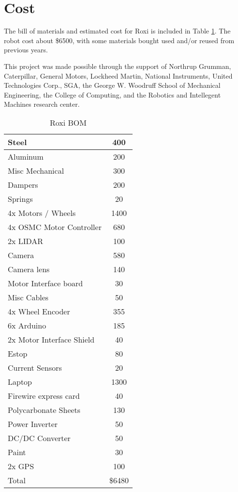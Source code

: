 \section{Cost}

The bill of materials and estimated cost for Roxi is included in Table \ref{TAB:Cost}. The robot cost about \$6500, with some materials bought used and/or reused from previous years.

This project was made possible through the support of Northrup Grumman, Caterpillar, General Motors, Lockheed Martin, National Instruments, United Technologies Corp., SGA, the George W. Woodruff School of Mechanical Engineering, the College of Computing, and the  Robotics and Intellegent Machines research center.

\begin{table}[H]
\begin{center}
\caption{Roxi BOM}
\begin{tabular}{| l | c |}
\hline

Steel	&	400\\	\hline
Aluminum	&	200\\	\hline
Misc Mechanical	&	300\\	\hline
Dampers	&	200\\	\hline
Springs	&	20\\	\hline
4x Motors / Wheels	&	1400\\	\hline
4x OSMC Motor Controller	&	680\\	\hline
2x LIDAR	&	100\\	\hline
Camera	&	580\\	\hline
Camera lens	&	140\\	\hline
Motor Interface board	&	30\\	\hline
Misc Cables	&	50\\	\hline
4x Wheel Encoder	&	355\\	\hline
6x Arduino	&	185\\	\hline
2x Motor Interface Shield	&	40\\	\hline
Estop	&	80\\	\hline
Current Sensors	&	20\\	\hline
Laptop	&	1300\\	\hline
Firewire express card	&	40\\	\hline
Polycarbonate Sheets	&	130\\	\hline
Power Inverter	&	50\\	\hline
DC/DC Converter	&	50\\	\hline
Paint	&	30\\	\hline
2x GPS	&	100\\	\hline
Total	&	\$6480\\	
\hline


\end{tabular}
\label{TAB:Cost}
\end{center}
\end{table}